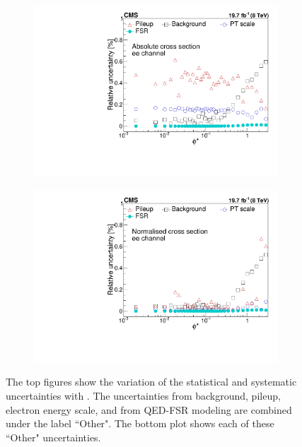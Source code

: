 \begin{figure}
\begin{subfigure}[b]{0.49\textwidth}
     \includegraphics[width=\linewidth]{figures/uncertainties/UncertaintyElecAbsType0.pdf}
     \caption{}
    \end{subfigure}
    \begin{subfigure}[b]{0.49\textwidth}
     \includegraphics[width=\linewidth]{figures/uncertainties/UncertaintyElecNormType0.pdf}
     \caption{}
    \end{subfigure}
    \caption{The top figures show the variation of the statistical and systematic uncertainties with \phistar. The uncertainties from background, pileup, electron energy scale, and from QED-FSR modeling are combined under the label ``Other".  The bottom plot shows each of these ``Other" uncertainties. }
    \label{fig:uncertainty}
\end{figure}
